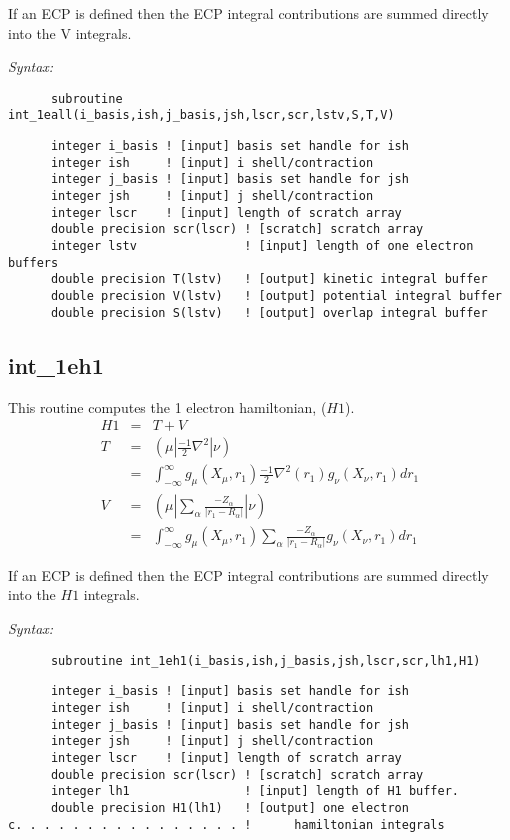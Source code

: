 If an ECP is defined then the ECP integral contributions are summed  
directly into the V integrals.   
 
{\it Syntax:} 
\begin{verbatim} 
      subroutine int_1eall(i_basis,ish,j_basis,jsh,lscr,scr,lstv,S,T,V) 
\end{verbatim} 
\begin{verbatim}  
      integer i_basis ! [input] basis set handle for ish 
      integer ish     ! [input] i shell/contraction 
      integer j_basis ! [input] basis set handle for jsh 
      integer jsh     ! [input] j shell/contraction 
      integer lscr    ! [input] length of scratch array 
      double precision scr(lscr) ! [scratch] scratch array 
      integer lstv               ! [input] length of one electron buffers 
      double precision T(lstv)   ! [output] kinetic integral buffer 
      double precision V(lstv)   ! [output] potential integral buffer 
      double precision S(lstv)   ! [output] overlap integral buffer 
\end{verbatim} 
 
\subsection{int\_1eh1} 
This routine computes the 1 electron hamiltonian, ($H1$). 
\begin{eqnarray*} 
H1 & = & T + V      \\ 
T  & = & ({\mu}|\frac{-1}{2}\nabla^{2}|{\nu}) \\ 
   & = & \int_{-\infty}^{\infty} g_{\mu}(X_{\mu},r_{1})\frac{-1}{2} 
\nabla^{2}(r_{1})g_{\nu}(X_{\nu},r_{1})dr_{1} \\ 
V  & = & ({\mu}|\sum_{\alpha}\frac{-Z_{\alpha}}{|r_{1}-R_{\alpha}|}|{\nu}) \\ 
   & = & \int_{-\infty}^{\infty} g_{\mu}(X_{\mu},r_{1})\sum_{\alpha}\frac 
{-Z_{\alpha}}{|r_{1}-R_{\alpha}|}g_{\nu}(X_{\nu},r_{1})dr_{1}  
\end{eqnarray*} 
 
If an ECP is defined then the ECP integral contributions are summed  
directly into the $H1$ integrals.   
 
{\it Syntax:} 
\begin{verbatim} 
      subroutine int_1eh1(i_basis,ish,j_basis,jsh,lscr,scr,lh1,H1) 
\end{verbatim} 
\begin{verbatim} 
      integer i_basis ! [input] basis set handle for ish 
      integer ish     ! [input] i shell/contraction 
      integer j_basis ! [input] basis set handle for jsh 
      integer jsh     ! [input] j shell/contraction 
      integer lscr    ! [input] length of scratch array 
      double precision scr(lscr) ! [scratch] scratch array 
      integer lh1                ! [input] length of H1 buffer. 
      double precision H1(lh1)   ! [output] one electron 
c. . . . . . . . . . . . . . . . !      hamiltonian integrals 
\end{verbatim} 
